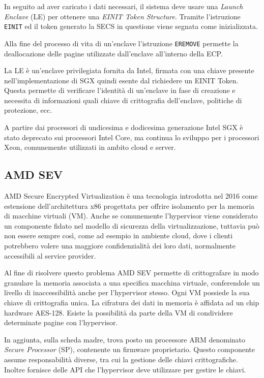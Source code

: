 \documentclass[12pt,italian]{report}
\begin{document}
	In seguito ad aver caricato i dati necessari, il sistema deve usare una \textit{Launch Enclave} (LE) per ottenere una \textit{EINIT Token Structure}. Tramite l'istruzione \texttt{EINIT} ed il token generato la SECS in questione viene segnata come inizializzata.
	
	Alla fine del processo di vita di un'enclave l'istruzione \texttt{EREMOVE} permette la deallocazione delle pagine utilizzate dall'enclave all'interno della ECP.
	
	La LE è un'enclave privilegiata fornita da Intel, firmata con una chiave presente nell'implementazione di SGX quindi esente dal richiedere un EINIT Token. Questa permette di verificare l'identità di un'enclave in fase di creazione e necessita di informazioni quali chiave di crittografia dell'enclave, politiche di protezione, ecc.
	
	\bigbreak
	
	A partire dai processori di undicesima e dodicesima generazione Intel SGX è stato deprecato sui processori Intel Core, ma continua lo sviluppo per i processori Xeon, comunemente utilizzati in ambito cloud e server.
	
	\subsection{AMD SEV}
	\label{subsec:sev}
	AMD Secure Encrypted Virtualization è una tecnologia introdotta nel 2016 come estensione dell'architettura x86 progettata per offrire isolamento per la memoria di macchine virtuali (VM). Anche se comunemente l'hypervisor viene considerato un componente fidato nel modello di sicurezza della virtualizzazione, tuttavia può non essere sempre così, come ad esempio in ambiente cloud, dove i clienti potrebbero volere una maggiore confidenzialità dei loro dati, normalmente accessibili al service provider.
	
	Al fine di risolvere questo problema AMD SEV permette di crittografare in modo granulare la memoria associata a una specifica macchina virtuale, conferendole un livello di inaccessibilità anche per l'hypervisor stesso. Ogni VM possiede la sua chiave di crittografia unica. La cifratura dei dati in memoria è affidata ad un chip hardware AES-128. Esiste la possibilità da parte della VM di condividere determinate pagine con l'hypervisor.
	
	In aggiunta, sulla scheda madre, trova posto un processore ARM denominato \textit{Secure Processor} (SP), contenente un firmware proprietario. Questo componente assume responsabilità diverse, tra cui la gestione delle chiavi crittografiche. Inoltre fornisce delle API che l'hypervisor deve utilizzare per gestire le chiavi.
	
\end{document}
